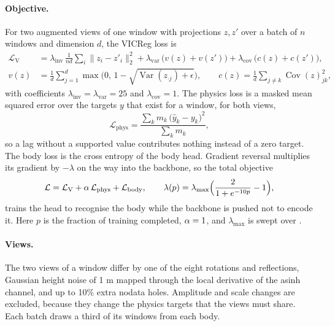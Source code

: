 \paragraph{Objective.} For two augmented views of one window with projections $z, z'$ over a
batch of $n$ windows and dimension $d$, the VICReg loss \citep{bardes2021} is
\begin{align}
  \mathcal{L}_{\mathrm{V}} &= \lambda_{\mathrm{inv}}\, \frac{1}{n d} \sum_{i} \lVert z_i - z'_i \rVert_2^2
  + \lambda_{\mathrm{var}}\,\bigl(v(z) + v(z')\bigr) + \lambda_{\mathrm{cov}}\,\bigl(c(z) + c(z')\bigr),
  \label{eq:vicreg}\\
  v(z) &= \frac{1}{d} \sum_{j=1}^{d} \max\bigl(0,\, 1 - \sqrt{\operatorname{Var}(z_{\cdot j}) + \epsilon}\bigr),
  \qquad
  c(z) = \frac{1}{d} \sum_{j \neq k} \operatorname{Cov}(z)_{jk}^2,
  \nonumber
\end{align}
with coefficients $\lambda_{\mathrm{inv}} = \lambda_{\mathrm{var}} = 25$ and
$\lambda_{\mathrm{cov}} = 1$. The physics loss is a masked mean squared error over the targets $y$
that exist for a window, for both views,
\begin{equation}
  \mathcal{L}_{\mathrm{phys}} = \frac{\sum_{k} m_k\, \bigl(\hat y_k - y_k\bigr)^2}{\sum_k m_k},
  \label{eq:phys}
\end{equation}
so a lag without a supported value contributes nothing instead of a zero target. The body loss is
the cross entropy of the body head. Gradient reversal multiplies its gradient by $-\lambda$ on the
way into the backbone, so the total objective
\begin{equation}
  \mathcal{L} = \mathcal{L}_{\mathrm{V}} + \alpha\, \mathcal{L}_{\mathrm{phys}} + \mathcal{L}_{\mathrm{body}},
  \qquad \lambda(p) = \lambda_{\max} \Bigl(\frac{2}{1 + e^{-10 p}} - 1\Bigr),
  \label{eq:total}
\end{equation}
trains the head to recognise the body while the backbone is pushed not to encode it. Here $p$ is
the fraction of training completed, $\alpha = 1$, and $\lambda_{\max}$ is swept over
\ConfigLambdas.

\paragraph{Views.} The two views of a window differ by one of the eight rotations and reflections,
Gaussian height noise of 1 m mapped through the local derivative of the asinh channel, and up to
10\% extra nodata holes. Amplitude and scale changes are excluded, because they change the physics
targets that the views must share. Each batch draws a third of its windows from each body.
